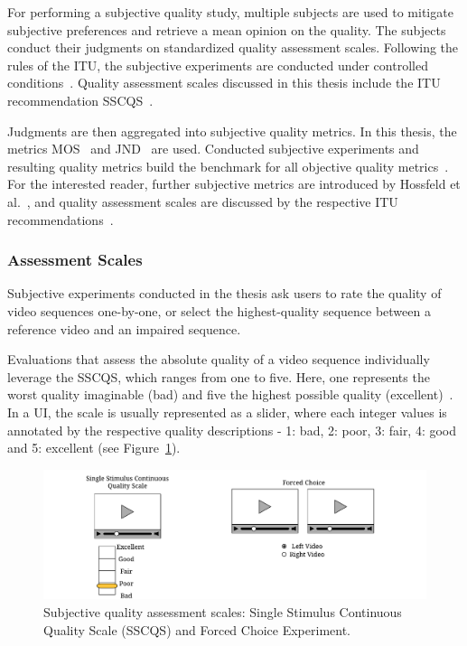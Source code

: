 For performing a subjective quality study, multiple subjects are used to mitigate subjective preferences and retrieve a mean opinion on the quality.
The subjects conduct their judgments on standardized quality assessment scales.
Following the rules of the \ac{ITU}, the subjective experiments are conducted under controlled conditions~\cite{ITU-R2012,Winkler2009}.
Quality assessment scales discussed in this thesis include the \ac{ITU} recommendation \ac{SSCQS}~\cite{ITU-R2012}. %

Judgments are then aggregated into subjective quality metrics.
In this thesis, the metrics \ac{MOS}~\cite{ITU-J800} and \ac{JND}~\cite{Watson2001} are used.
Conducted subjective experiments and resulting quality metrics build the benchmark for all objective quality metrics~\cite{Winkler2008}. 
For the interested reader, further subjective metrics are introduced by Hossfeld et al.~\cite{Hossfeld2016}, and quality assessment scales are discussed by the respective \ac{ITU} recommendations~\cite{ITU-R2012,ITU-J800}.
\subsubsection{Assessment Scales}
Subjective experiments conducted in the thesis ask users to rate the quality of video sequences one-by-one, or select the highest-quality sequence between a reference video and an impaired sequence.

Evaluations that assess the absolute quality of a video sequence individually leverage the \ac{SSCQS}, which ranges from one to five.
Here, one represents the worst quality imaginable (bad) and five the highest possible quality (excellent)~\cite{ITU-R2012}.
In a \ac{UI}, the scale is usually represented as a slider, where each integer values is annotated by the respective quality descriptions - 1: bad, 2: poor, 3: fair, 4: good and 5: excellent (see Figure~\ref{fig:210_qualityscales}).
\begin{figure}[th]
\centering
\includegraphics[width=\linewidth]{gfx/200_Background/qualityScales}
\caption[Subjective quality assessment scales]{Subjective quality assessment scales: Single Stimulus Continuous Quality Scale (SSCQS) and Forced Choice Experiment.}
\label{fig:210_qualityscales}
\end{figure}

